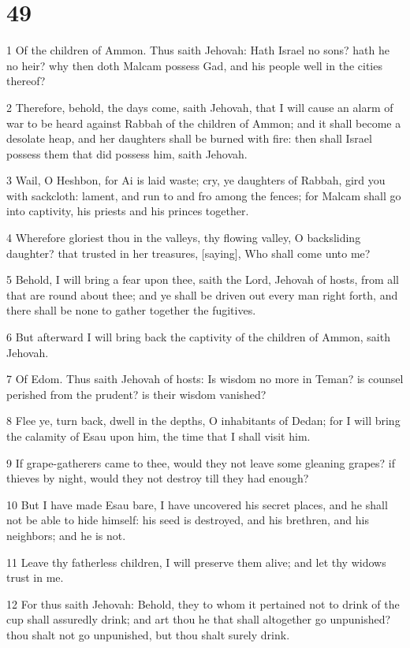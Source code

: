 \chapter{49}

\par 1 Of the children of Ammon. Thus saith Jehovah: Hath Israel no sons? hath he no heir? why then doth Malcam possess Gad, and his people well in the cities thereof?
\par 2 Therefore, behold, the days come, saith Jehovah, that I will cause an alarm of war to be heard against Rabbah of the children of Ammon; and it shall become a desolate heap, and her daughters shall be burned with fire: then shall Israel possess them that did possess him, saith Jehovah.
\par 3 Wail, O Heshbon, for Ai is laid waste; cry, ye daughters of Rabbah, gird you with sackcloth: lament, and run to and fro among the fences; for Malcam shall go into captivity, his priests and his princes together.
\par 4 Wherefore gloriest thou in the valleys, thy flowing valley, O backsliding daughter? that trusted in her treasures, [saying], Who shall come unto me?
\par 5 Behold, I will bring a fear upon thee, saith the Lord, Jehovah of hosts, from all that are round about thee; and ye shall be driven out every man right forth, and there shall be none to gather together the fugitives.
\par 6 But afterward I will bring back the captivity of the children of Ammon, saith Jehovah.
\par 7 Of Edom. Thus saith Jehovah of hosts: Is wisdom no more in Teman? is counsel perished from the prudent? is their wisdom vanished?
\par 8 Flee ye, turn back, dwell in the depths, O inhabitants of Dedan; for I will bring the calamity of Esau upon him, the time that I shall visit him.
\par 9 If grape-gatherers came to thee, would they not leave some gleaning grapes? if thieves by night, would they not destroy till they had enough?
\par 10 But I have made Esau bare, I have uncovered his secret places, and he shall not be able to hide himself: his seed is destroyed, and his brethren, and his neighbors; and he is not.
\par 11 Leave thy fatherless children, I will preserve them alive; and let thy widows trust in me.
\par 12 For thus saith Jehovah: Behold, they to whom it pertained not to drink of the cup shall assuredly drink; and art thou he that shall altogether go unpunished? thou shalt not go unpunished, but thou shalt surely drink.

